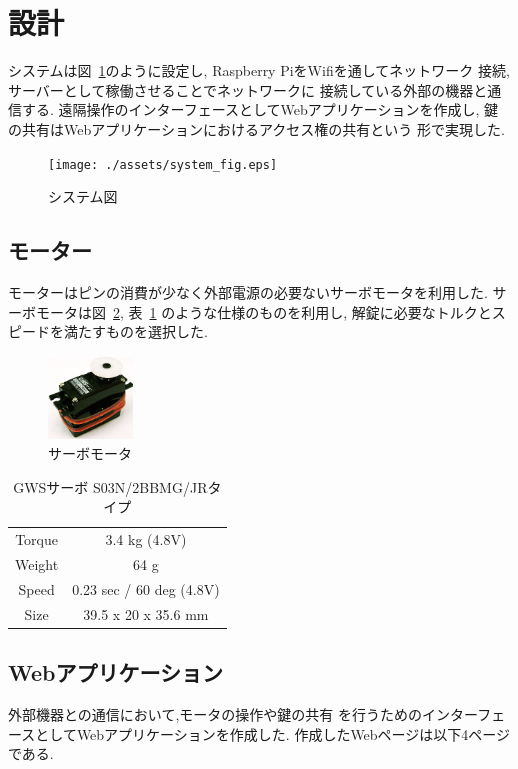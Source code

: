 \section{設計}
システムは図~\ref{fig:system_fig}のように設定し,
Raspberry PiをWifiを通してネットワーク
接続,サーバーとして稼働させることでネットワークに
接続している外部の機器と通信する.
遠隔操作のインターフェースとしてWebアプリケーションを作成し,
鍵の共有はWebアプリケーションにおけるアクセス権の共有という
形で実現した.

\begin{figure}[htbp]
  \centering
  \texttt{[image: ./assets/system\_fig.eps]}
  \caption{システム図}
  \label{fig:system_fig}
\end{figure}

\subsection{モーター}
モーターはピンの消費が少なく外部電源の必要ないサーボモータを利用した.
サーボモータは図~\ref{fig:servo}, 表~\ref{tbl:servo_specifications}
のような仕様のものを利用し,
解錠に必要なトルクとスピードを満たすものを選択した.

\begin{figure}[htbp]
  \centering
  \includegraphics[width=0.2\textwidth]{./assets/servo.eps}
  \caption{サーボモータ}
  \label{fig:servo}
\end{figure}

\begin{table}[htbp]
  \begin{center}
    \begin{tabular}{cc}
      Torque & 3.4 kg (4.8V)  \\
      Weight & 64 g  \\
      Speed  & 0.23 sec / 60 deg (4.8V) \\
      Size   & 39.5 x 20 x 35.6 mm
    \end{tabular}
    \caption{GWSサーボ S03N/2BBMG/JRタイプ}
    \label{tbl:servo_specifications}
  \end{center}
\end{table}

\subsection{Webアプリケーション}
外部機器との通信において,モータの操作や鍵の共有
を行うためのインターフェースとしてWebアプリケーションを作成した.
作成したWebページは以下4ページである.

